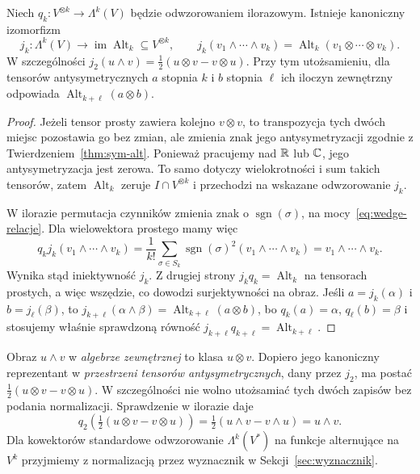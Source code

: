 \begin{twierdzenie}
\label{thm:wedge-alt}
Niech $q_k\colon V^{\otimes k}\to\Lambda^k(V)$ będzie odwzorowaniem
ilorazowym. Istnieje kanoniczny izomorfizm
\[
 j_k\colon\Lambda^k(V)\longrightarrow
 \operatorname{im}\operatorname{Alt}_k\subseteq V^{\otimes k},
 \qquad j_k(v_1\wedge\cdots\wedge v_k)
 =\operatorname{Alt}_k(v_1\otimes\cdots\otimes v_k).
\]
W szczególności $j_2(u\wedge v)=
\tfrac12(u\otimes v-v\otimes u)$. Przy tym utożsamieniu,
dla tensorów antysymetrycznych $a$ stopnia $k$ i $b$ stopnia
$\ell$ ich iloczyn zewnętrzny odpowiada
$\operatorname{Alt}_{k+\ell}(a\otimes b)$.
\end{twierdzenie}
\begin{proof}
Jeżeli tensor prosty zawiera kolejno $v\otimes v$, to
transpozycja tych dwóch miejsc pozostawia go bez zmian,
ale zmienia znak jego antysymetryzacji zgodnie z
Twierdzeniem~\ref{thm:sym-alt}. Ponieważ pracujemy nad
$\mathbb{R}$ lub $\mathbb{C}$, jego antysymetryzacja jest zerowa.
To samo dotyczy wielokrotności i sum takich tensorów,
zatem $\operatorname{Alt}_k$ zeruje $I\cap V^{\otimes k}$
i przechodzi na wskazane odwzorowanie $j_k$.

W ilorazie permutacja czynników zmienia znak o
$\operatorname{sgn}(\sigma)$, na mocy~\eqref{eq:wedge-relacje}.
Dla wielowektora prostego mamy więc
\[
 q_kj_k(v_1\wedge\cdots\wedge v_k)
 =\frac1{k!}\sum_{\sigma\in S_k}
 \operatorname{sgn}(\sigma)^2
 (v_1\wedge\cdots\wedge v_k)
 =v_1\wedge\cdots\wedge v_k.
\]
Wynika stąd iniektywność $j_k$. Z drugiej strony
$j_kq_k=\operatorname{Alt}_k$ na tensorach prostych,
a więc wszędzie, co dowodzi surjektywności na obraz.
Jeśli $a=j_k(\alpha)$ i $b=j_\ell(\beta)$, to
$j_{k+\ell}(\alpha\wedge\beta)
=\operatorname{Alt}_{k+\ell}(a\otimes b)$,
bo $q_k(a)=\alpha$, $q_\ell(b)=\beta$ i stosujemy właśnie
sprawdzoną równość $j_{k+\ell}q_{k+\ell}=\operatorname{Alt}_{k+\ell}$.
\end{proof}

\begin{uwaga}
\label{rem:normalizacja-wedge}
Obraz $u\wedge v$ w \emph{algebrze zewnętrznej} to klasa
$u\otimes v$. Dopiero jego kanoniczny reprezentant w
\emph{przestrzeni tensorów antysymetrycznych}, dany przez $j_2$,
ma postać $\tfrac12(u\otimes v-v\otimes u)$. W szczególności
nie wolno utożsamiać tych dwóch zapisów bez podania
normalizacji. Sprawdzenie w ilorazie daje
\[
 q_2\!\left(\tfrac12(u\otimes v-v\otimes u)\right)
 =\tfrac12(u\wedge v-v\wedge u)=u\wedge v.
\]
Dla kowektorów standardowe odwzorowanie
$\Lambda^k(V^*)$ na funkcje alternujące na $V^k$
przyjmiemy z normalizacją przez wyznacznik w
Sekcji~\ref{sec:wyznacznik}.
\end{uwaga}

